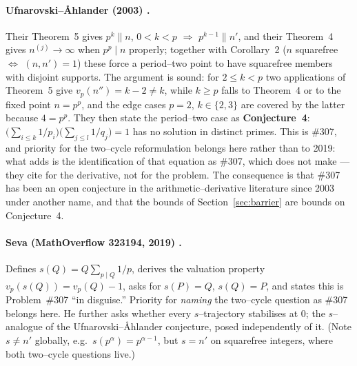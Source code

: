 \documentclass[11pt]{article}
\theoremstyle{definition}
\begin{document}
\paragraph{Ufnarovski--\AA hlander (2003) \cite{UfnarovskiAhlander2003}.}
Their Theorem~5 gives $p^{k}\|n$, $0<k<p$ $\Rightarrow$ $p^{k-1}\|n'$, and their Theorem~4 gives
$n^{(j)}\to\infty$ when $p^{p}\mid n$ properly; together with Corollary~2 ($n$ squarefree
$\Leftrightarrow$ $(n,n')=1$) these force a period--two point to have squarefree members with
disjoint supports. The argument is sound: for $2\le k<p$ two applications of Theorem~5 give
$v_p(n'')=k-2\ne k$, while $k\ge p$ falls to Theorem~4 or to the fixed point $n=p^p$, and the edge
cases $p=2$, $k\in\{2,3\}$ are covered by the latter because $4=p^p$. They then state the
period--two case as \textbf{Conjecture~4}: $\bigl(\sum_{i\le k}1/p_i\bigr)\bigl(\sum_{j\le l}
1/q_j\bigr)=1$ has no solution in distinct primes. This is \#307, and priority for the two--cycle
reformulation belongs here rather than to 2019: what \cite{Seva323194} adds is the identification of
that equation as \#307, which \cite{UfnarovskiAhlander2003} does not make --- they cite
\cite{Barbeau1961} for the derivative, not \cite{Barbeau1976} for the problem. The consequence is
that \#307 has been an open conjecture in the arithmetic--derivative literature since 2003 under
another name, and that the bounds of Section~\ref{sec:barrier} are bounds on Conjecture~4.

\paragraph{Seva (MathOverflow 323194, 2019) \cite{Seva323194}.}
Defines $s(Q)=Q\sum_{p\mid Q}1/p$, derives the valuation property $v_p(s(Q))=v_p(Q)-1$, asks for
$s(P)=Q$, $s(Q)=P$, and states this is Problem~\#307 ``in disguise.'' Priority for \emph{naming}
the two--cycle question as \#307 belongs here. He further asks whether every $s$--trajectory stabilises at $0$; the
$s$--analogue of the Ufnarovski--\AA hlander conjecture, posed independently of it. (Note $s\ne n'$
globally, e.g.\ $s(p^\alpha)=p^{\alpha-1}$, but $s=n'$ on squarefree integers, where both two--cycle
questions live.)
\end{document}
